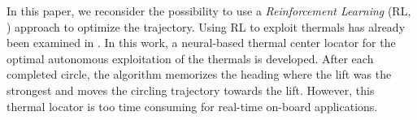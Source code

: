 \documentclass{jfpda}
\begin{document}


In this paper, we reconsider the possibility to use a \emph{Reinforcement Learning} (RL, \cite{sutton_book}) approach to optimize the trajectory. Using RL to exploit thermals has already been examined in \cite{wharington_phd}. In this work, a neural-based thermal center locator for the optimal autonomous exploitation of the thermals is developed. After each completed circle, the algorithm memorizes the heading where the lift was the strongest and moves the circling trajectory towards the lift. However, this thermal locator is too time consuming for real-time on-board applications.
\end{document}

